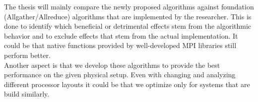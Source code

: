 \documentclass[a4paper,%
	12pt,%
	DIV14,
	headsepline,%
	headings=normal,
]{scrartcl}
\theoremstyle{definition}
\theoremstyle{remark}
\begin{document}
The thesis will mainly compare the newly proposed algorithms against foundation (Allgather/Allreduce) algorithms that are implemented by the researcher. This is done to identify which beneficial or detrimental effects stem from the algorithmic behavior and to exclude effects that stem from the actual implementation. It could be that native functions provided by well-developed MPI libraries still perform better.\\
Another aspect is that we develop these algorithms to provide the best performance on the given physical setup. Even with changing and analyzing different processor layouts it could be that we optimize only for systems that are build similarly. 


\newpage


\end{document}
